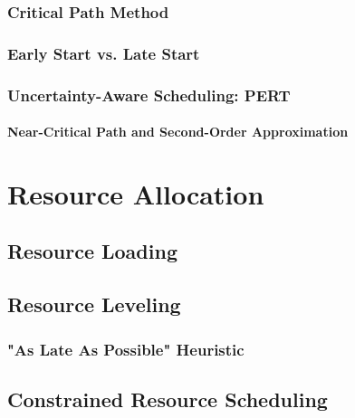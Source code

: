 		\subsection{Critical Path Method} %

		\subsection{Early Start vs. Late Start} %

		\subsection{Uncertainty-Aware Scheduling: PERT} %

			\subsubsection{Near-Critical Path and Second-Order Approximation} %

\chapter{Resource Allocation} %

	\section{Resource Loading} %

	\section{Resource Leveling} %

		\subsection{"As Late As Possible" Heuristic} %

	\section{Constrained Resource Scheduling} %


